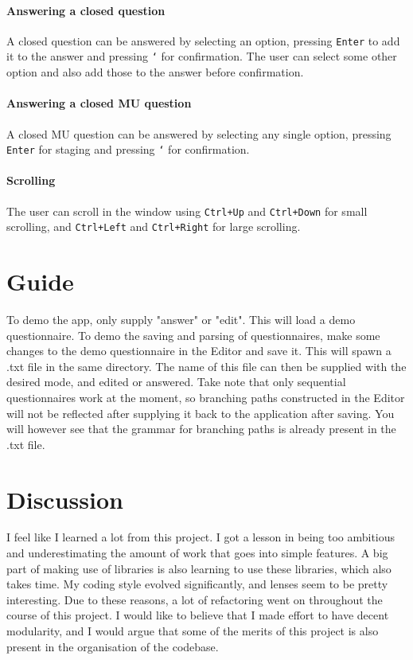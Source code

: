 \documentclass[11pt,a4paper]{article}
\begin{document}
\paragraph{Answering a closed question}
A closed question can be answered by selecting an option, pressing \texttt{Enter} to add it to the answer and pressing \texttt{`} for confirmation. The user can select some other option and also add those to the answer before confirmation.

\paragraph{Answering a closed MU question}
A closed MU question can be answered by selecting any single option, pressing \texttt{Enter} for staging and pressing \texttt{`} for confirmation.

\paragraph{Scrolling}
The user can scroll in the window using \texttt{Ctrl+Up} and \texttt{Ctrl+Down} for small scrolling, and \texttt{Ctrl+Left} and \texttt{Ctrl+Right} for large scrolling.

\section{Guide}
To demo the app, only supply "answer" or "edit". This will load a demo questionnaire. To demo the saving and parsing of questionnaires, make some changes to the demo questionnaire in the Editor and save it. This will spawn a .txt file in the same directory. The name of this file can then be supplied with the desired mode, and edited or answered. Take note that only sequential questionnaires work at the moment, so branching paths constructed in the Editor will not be reflected after supplying it back to the application after saving. You will however see that the grammar for branching paths is already present in the .txt file.

\section{Discussion}
I feel like I learned a lot from this project. I got a lesson in being too ambitious and underestimating the amount of work that goes into simple features. A big part of making use of libraries is also learning to use these libraries, which also takes time. My coding style evolved significantly, and lenses seem to be pretty interesting. Due to these reasons, a lot of refactoring went on throughout the course of this project. I would like to believe that I made effort to have decent modularity, and I would argue that some of the merits of this project is also present in the organisation of the codebase.
\end{document}
